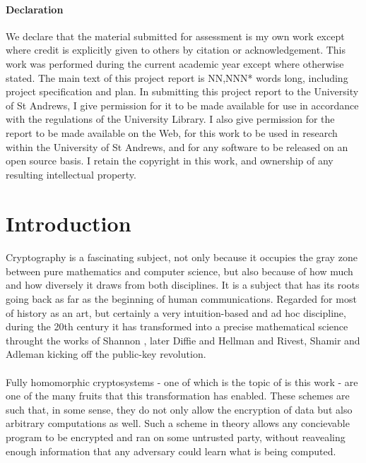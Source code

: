 \documentclass{article}
\theoremstyle{definition}
\begin{document}
\paragraph{Declaration}
We declare that the material submitted for assessment is my own work except where credit is explicitly given to others by citation or acknowledgement. This work was performed during the current academic year except where otherwise stated. The main text of this project report is NN,NNN* words long, including project specification and plan. In submitting this project report to the University of St Andrews, I give permission for it to be made available for use in accordance with the regulations of the University Library. I also give permission for the report to be made available on the Web, for this work to be used in research within the University of St Andrews, and for any software to be released on an open source basis. I retain the copyright in this work, and ownership of any resulting intellectual property.

\newpage

\tableofcontents

\newpage


\section{Introduction}
\paragraph{}
Cryptography is a fascinating subject, not only because it occupies the gray
zone between pure mathematics and computer science, but also because of how much
and how diversely it draws from both disciplines. It is a subject that has its
roots going back as far as the beginning of human communications. Regarded
for most of history as an art, but certainly a very intuition-based and ad hoc
discipline, during the 20th century it has transformed into a precise mathematical
science throught the works of Shannon \cite{shannon1949communication}, later Diffie and Hellman
\cite{diffie1976new} and Rivest, Shamir and Adleman \cite{rivest1978method}
kicking off the public-key revolution.
\paragraph{}
Fully homomorphic cryptosystems - one of which is the topic of is this work - are one
of the many fruits that this transformation has enabled. These schemes are such
that, in some sense, they do not only allow the encryption of data but also
arbitrary computations as well. Such a scheme in theory allows any concievable
program to be encrypted and ran on some untrusted party, without reavealing
enough information that any adversary could learn what is being computed.
\end{document}
